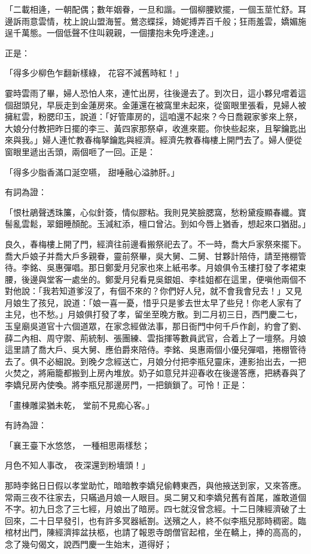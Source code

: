 「二載相逄，一朝配偶；數年姻眷，一旦和諧。一個柳腰欵擺，一個玉莖忙舒。耳邊訴雨意雲情，枕上說山盟海誓。鶯恣蝶採，婍妮搏弄百千般；狂雨羞雲，嬌媚施逞千萬態。一個低聲不住叫親親，一個摟抱未免呼達達。」

正是：

「得多少柳色乍翻新樣綠，  花容不減舊時紅！」

霎時雲雨了畢，婦人恐怕人來，連忙出房，往後邊去了。到次日，這小夥兒嚐着這個甜頭兒，早辰走到金蓮房來。金蓮還在被窩里未起來，從窗眼里張看，見婦人被擁紅雲，粉腮印玉，說道：「好管庫房的，這咱還不起來？今日喬親家爹來上祭，大娘分付教把昨日擺的李三、黃四家那祭卓，收進來罷。你快些起來，且挐鑰匙出來與我。」婦人連忙教春梅拏鑰匙與經濟。經濟先教春梅樓上開門去了。婦人便從窗眼里遞出舌頭，兩個咂了一回。正是：

「得多少脂香滿口涎空嚥，  甜唾融心溢肺肝。」

有詞為證：

「恨杜鵑聲透珠簾，心似針簽，情似膠粘。我則見笑臉腮窩，愁粉黛瘦顯春纖。寶髻亂雲鬆，翠鈿睡顏酡。玉減紅添，檀口曾沾。到如今唇上猶香，想起來口猶甜。」

良久，春梅樓上開了門，經濟往前邊看搬祭祀去了。不一時，喬大戶家祭來擺下。喬大戶娘子并喬大戶多親眷，靈前祭畢，吳大舅、二舅、甘夥計陪侍，請至捲棚管待。李銘、吳惠彈唱。那日鄭愛月兒家也來上紙弔孝。月娘俱令玉樓打發了孝裙束腰，後邊與堂客一處坐的。鄭愛月兒看見吳銀姐、李桂姐都在這里，便嗔他兩個不對他說：「我若知道爹沒了，有個不來的？你們好人兒，就不會我會兒去！」又見月娘生了孩兒，說道：「娘一喜一憂，惜乎只是爹去世太早了些兒！你老人家有了主兒，也不愁。」月娘俱打發了孝，留坐至晚方散。到二月初三日，西門慶二七，玉皇廟吳道官十六個道眾，在家念經做法事，那日衙門中何千戶作創，約會了劉、薛二內相、周守禦、荊統制、張團練、雲指揮等數員武官，合着上了一壇祭。月娘這里請了喬大戶、吳大舅、應伯爵來陪侍。李銘、吳惠兩個小優兒彈唱，捲棚管待去了。俱不必細說。到晚夕念經送亡，月娘分付把李瓶兒靈床，連影抬出去，一把火焚之，將廂籠都搬到上房內堆放。奶子如意兒并迎春收在後邊答應，把綉春與了李嬌兒房內使喚。將李瓶兒那邊房門，一把鎖鎖了。可怜！正是：

「畫棟雕梁猶未乾，  堂前不見痴心客。」

有詩為證：

「襄王臺下水悠悠，  一種相思兩樣愁；

月色不知人事改，  夜深還到粉墻頭！」

那時李銘日日假以孝堂助忙，暗暗教李嬌兒偷轉東西，與他掖送到家，又來答應。常兩三夜不往家去，只瞞過月娘一人眼目。吳二舅又和李嬌兒舊有首尾，誰敢道個不字。初九日念了三七經，月娘出了暗房。四七就沒曾念經。十二日陳經濟破了土回來，二十日早發引，也有許多冥器紙劄。送殯之人，終不似李瓶兒那時稠密。臨棺材出門，陳經濟摔盆扶柩，也請了報恩寺朗僧官起棺，坐在轎上，捧的高高的，念了幾句偈文，說西門慶一生始末，道得好；

